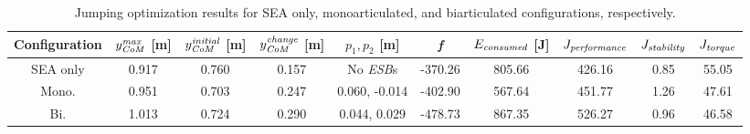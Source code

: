 \documentclass[letterpaper, 10 pt, conference]{ieeeconf}  %
\begin{document}
\begin{table}[ht]
	\caption{Jumping optimization results for SEA only, monoarticulated, and biarticulated configurations, respectively.}
	\label{table:maxheight}
	\begin{center}
		\begin{tabular}[t]{c|c|c|c|c|c|c|c|c|c}
			Configuration &  $y_{\text{\textit{CoM}}}^{\text{\textit{max}}}$ [m] & $y_{\text{\textit{CoM}}}^{\text{\textit{initial}}}$ [m]& $y_{\text{\textit{CoM}}}^{\text{\textit{change}}}$ [m]& $p_1,p_2$ [m] & \textit{f} & $E_{\text{\textit{consumed}}}$ [J] & $J_{\text{\textit{performance}}}$ & $J_{\text{\textit{stability}}}$ & $J_{\text{\textit{torque}}}$ \\ 
			\hline
			SEA only	& 0.917 & 0.760 & 0.157 & No \textit{ESB}s	& -370.26 & 805.66 & 426.16 & 0.85 & 55.05\\
			\hline
			Mono.		& 0.951 & 0.703 & 0.247 & 0.060, -0.014	& -402.90 & 567.64 & 451.77 & 1.26 & 47.61 \\
			\hline
			Bi.			& 1.013 & 0.724 & 0.290 & 0.044, 0.029		& -478.73 & 867.35 & 526.27 & 0.96 & 46.58
		\end{tabular}
	\end{center}
\end{table}
\end{document}
